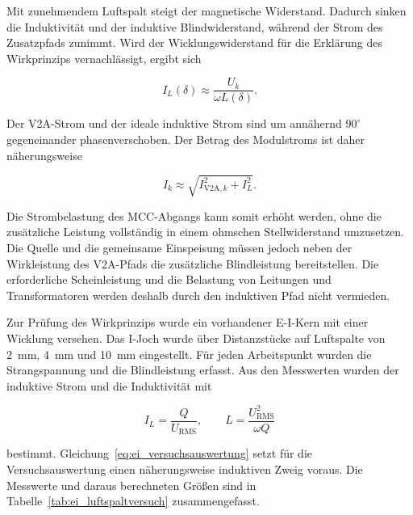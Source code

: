 Mit zunehmendem Luftspalt steigt der magnetische Widerstand. Dadurch sinken
die Induktivität und der induktive Blindwiderstand, während der Strom des
Zusatzpfads zunimmt. Wird der Wicklungswiderstand für die Erklärung des
Wirkprinzips vernachlässigt, ergibt sich

\begin{equation}
    I_L(\delta)
    \approx
    \frac{U_k}{\omega L(\delta)}.
    \label{eq:ei_blindstrom}
\end{equation}

Der V2A-Strom und der ideale induktive Strom sind um annähernd
$90^{\circ}$ gegeneinander phasenverschoben. Der Betrag des Modulstroms ist
daher näherungsweise

\begin{equation}
    I_k
    \approx
    \sqrt{I_{\mathrm{V2A},k}^{2}+I_L^{2}}.
    \label{eq:ei_modulstrombetrag}
\end{equation}

Die Strombelastung des MCC-Abgangs kann somit erhöht werden, ohne die
zusätzliche Leistung vollständig in einem ohmschen Stellwiderstand
umzusetzen. Die Quelle und die gemeinsame Einspeisung müssen jedoch neben der
Wirkleistung des V2A-Pfads die zusätzliche Blindleistung bereitstellen. Die
erforderliche Scheinleistung und die Belastung von Leitungen und
Transformatoren werden deshalb durch den induktiven Pfad nicht vermieden.

Zur Prüfung des Wirkprinzips wurde ein vorhandener E-I-Kern mit einer
Wicklung versehen. Das I-Joch wurde über Distanzstücke auf Luftspalte von
\SI{2}{\milli\metre}, \SI{4}{\milli\metre} und
\SI{10}{\milli\metre} eingestellt. Für jeden Arbeitspunkt wurden die
Strangspannung und die Blindleistung erfasst. Aus den Messwerten wurden der
induktive Strom und die Induktivität mit

\begin{equation}
    I_L
    =
    \frac{Q}{U_{\mathrm{RMS}}},
    \qquad
    L
    =
    \frac{U_{\mathrm{RMS}}^2}{\omega Q}
    \label{eq:ei_versuchsauswertung}
\end{equation}

bestimmt. Gleichung~\ref{eq:ei_versuchsauswertung} setzt für die
Versuchsauswertung einen näherungsweise induktiven Zweig voraus. Die
Messwerte und daraus berechneten Größen sind in
Tabelle~\ref{tab:ei_luftspaltversuch} zusammengefasst.

